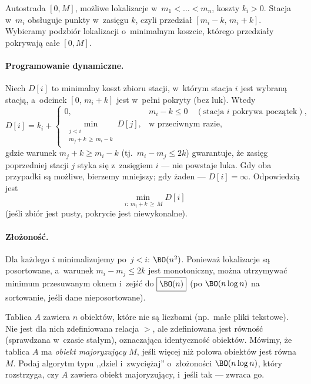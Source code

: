Autostrada $[0,M]$, możliwe lokalizacje w~$m_1<\dots<m_n$, koszty $k_i>0$.
Stacja w~$m_i$ obsługuje punkty w~zasięgu $k$, czyli przedział $[m_i-k,\,m_i+k]$.
Wybieramy podzbiór lokalizacji o~minimalnym koszcie, którego przedziały pokrywają
całe $[0,M]$.

\paragraph{Programowanie dynamiczne.}
Niech $D[i]$ to minimalny koszt zbioru stacji, w~którym stacja $i$ jest
 wybraną stacją, a~odcinek $[0,\,m_i+k]$ jest w~pełni
pokryty (bez luk). Wtedy
\[
	D[i]=k_i+
	\begin{cases}
		0, & m_i-k\leq 0 \quad(\text{stacja $i$ pokrywa początek}),\\[2pt]
		\displaystyle\min_{\substack{j<i\\ m_j+k\,\geq\, m_i-k}} D[j], & \text{w~przeciwnym razie,}
	\end{cases}
\]
gdzie warunek $m_j+k\geq m_i-k$ (tj.\ $m_i-m_j\leq 2k$) gwarantuje, że zasięg
poprzedniej stacji $j$ styka się z~zasięgiem $i$ --- nie powstaje luka. Gdy oba
przypadki są możliwe, bierzemy mniejszy; gdy żaden --- $D[i]=\infty$.
Odpowiedzią jest
\[
	\min_{\,i:\ m_i+k\,\geq\, M} D[i]
\]
(jeśli zbiór jest pusty, pokrycie jest niewykonalne).

\paragraph{Złożoność.}
Dla każdego $i$ minimalizujemy po~$j<i$: $\BO(n^2)$. Ponieważ lokalizacje są
posortowane, a~warunek $m_i-m_j\leq 2k$ jest monotoniczny, można utrzymywać
minimum przesuwanym oknem i~zejść do $\boxed{\BO(n)}$ (po $\BO(n\log n)$ na
sortowanie, jeśli dane nieposortowane).

\clearpage
\begin{zadanie}
	Tablica $A$ zawiera $n$ obiektów, które nie są liczbami (np.\ małe pliki
	tekstowe). Nie jest dla nich zdefiniowana relacja $>$, ale zdefiniowana jest
	równość (sprawdzana w~czasie stałym), oznaczająca identyczność obiektów.
	Mówimy, że tablica $A$ ma \emph{obiekt majoryzujący} $M$, jeśli więcej niż
	połowa obiektów jest równa $M$. Podaj algorytm typu ,,dziel i~zwyciężaj''
	o~złożoności $\BO(n\log n)$, który rozstrzyga, czy $A$ zawiera obiekt
	majoryzujący, i~jeśli tak --- zwraca go.
\end{zadanie}

